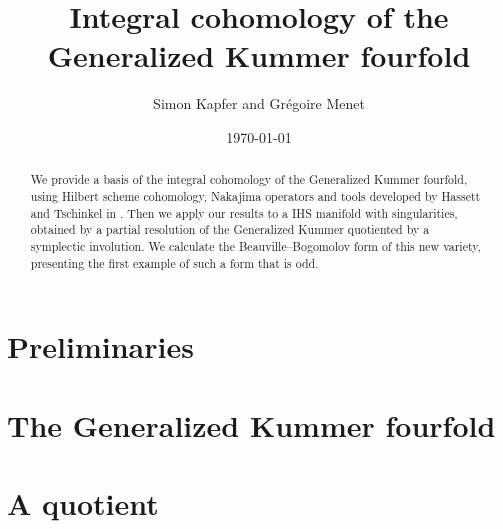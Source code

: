 \documentclass[a4paper]{article}
\begin{document}
\title{\bf Integral cohomology of the Generalized Kummer fourfold}


\author{Simon Kapfer and Gr\'egoire Menet}


\date{\today}

\maketitle
\begin{abstract}
We provide a basis of the integral cohomology of the Generalized Kummer fourfold, using Hilbert scheme cohomology, Nakajima operators and tools developed by Hassett and Tschinkel in \cite{Hassett}.
Then we apply our results to a IHS manifold with singularities, obtained by a partial resolution of the Generalized Kummer quotiented by a symplectic involution. 
We calculate the Beauville--Bogomolov form of this new variety, presenting the first example of such a form that is odd.
\end{abstract}


\part{Preliminaries}







\part{The Generalized Kummer fourfold}\label{integralcohomology}




\part{A quotient}\label{quotient}



\end{document}
